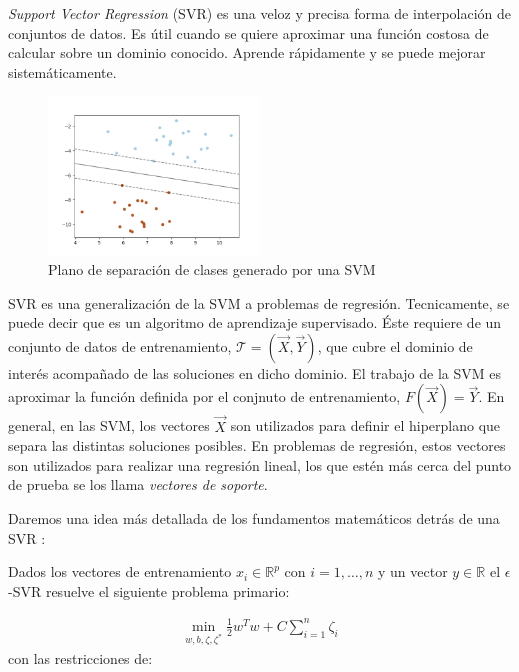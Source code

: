     \par \textit{Support Vector Regression} (SVR)\cite{support_vector_regression, review_svr}
      es una veloz y precisa forma de interpolación de conjuntos de datos.
      Es útil cuando se quiere aproximar una función costosa de calcular sobre un
      dominio conocido. Aprende rápidamente y se puede mejorar sistemáticamente.

      \begin{figure}
      \centering%
      \includegraphics[width=0.5\textwidth]{images/svm_hiperplane}%
      \caption{Plano de separación de clases generado por una SVM}\label{fig:svm}
      \end{figure}

    \par SVR es una generalización de la SVM a problemas de regresión. Tecnicamente,
      se puede decir que es un algoritmo de aprendizaje supervisado. Éste
      requiere de un conjunto de datos de entrenamiento,
      $\mathcal{T} = (\vec{X}, \vec{Y})$, que cubre el dominio de interés acompañado
      de las soluciones en dicho dominio. El trabajo de la SVM es aproximar la función
      definida por el conjnuto de entrenamiento, $F(\vec{X}) = \vec{Y}$. En general,
      en las SVM, los vectores $\vec{X}$ son utilizados para definir el hiperplano que
      separa las distintas soluciones posibles. En problemas de regresión, estos
      vectores son utilizados para realizar una regresión lineal, los que estén
      más cerca del punto de prueba se los llama \textit{vectores de soporte}.

      Daremos una idea más detallada de los fundamentos matemáticos detrás de una
      SVR \cite{svr_tutorial}:

      Dados los vectores de entrenamiento $x_{i} \in \mathbb{R}^{p}$ con $i = 1, \dots ,n$
      y un vector $y \in \mathbb{R}$ el $\epsilon$-SVR resuelve el siguiente problema
      primario:

      \begin{align}
        \min\limits_{w, b, \zeta, \zeta^{*}} \frac{1}{2} w^{T} w + C \sum_{i = 1}^{n} \zeta_{i}
      \end{align}
      con las restricciones de:


